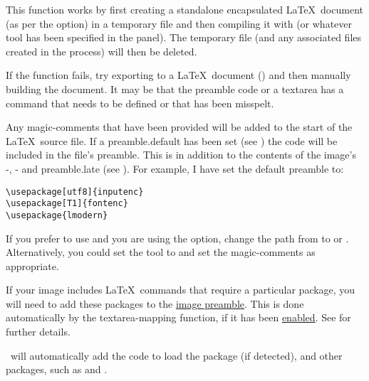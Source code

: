 This function works by first creating a standalone encapsulated
\LaTeX\ document (as per the  option) 
in a temporary file and then compiling it with
 (or whatever tool has been specified in the
 panel). The temporary file (and any
associated files created in the process) will then be deleted.

\begin{information}
If the  function fails, try exporting to a
\LaTeX\ document () and then manually
building the document. It may be that the preamble code or 
a \gls{textarea} has a command that needs to be defined or that has
been misspelt.
\end{information}

Any \glspl{magic-comment} that have been provided will be added to
the start of the \LaTeX\ source file.  If a \gls{preamble.default}
has been set (see ) the code will
be included in the  file's preamble.  This is in addition
to the contents of the image's -,
- and \gls{preamble.late} (see
). For example, I have set the default
preamble to:
\begin{verbatim}
\usepackage[utf8]{inputenc}
\usepackage[T1]{fontenc}
\usepackage{lmodern}
\end{verbatim}
If you prefer to use  and you are using the
 option, change the
 path from  to
 or . Alternatively, you could set the
 tool to  and set the
\glspl{magic-comment} as appropriate.

If your image includes \LaTeX\ commands that require a particular
package, you will need to add these packages to the
\hyperref[sec:preamble]{image preamble}. This is done automatically
by the \gls{textarea-mapping} function, if it has been
\hyperref[mi:texmappings]{enabled}.  See
 for further details.

\FlowframTk\ will automatically add
the code to load the  package (if detected),
and other packages, such as  and .


